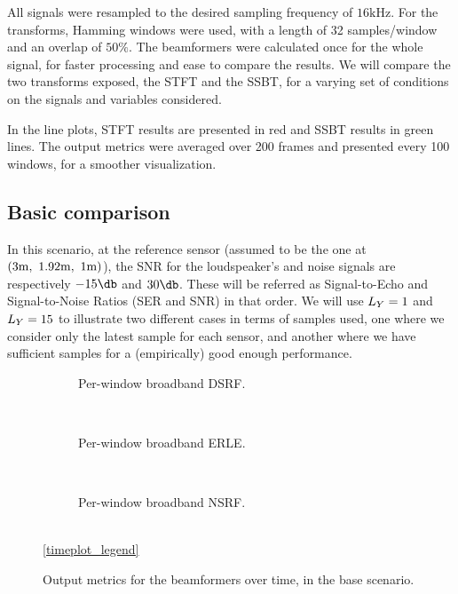 All signals were resampled to the desired sampling frequency of $16\si{\kilo\hertz}$. For the transforms, Hamming windows were used, with a length of 32 samples/window and an overlap of $50\%$. The beamformers were calculated once for the whole signal, for faster processing and ease to compare the results. We will compare the two transforms exposed, the STFT and the SSBT, for a varying set of conditions on the signals and variables considered.

In the line plots, STFT results are presented in red and SSBT results in green lines. The output metrics were averaged over 200 frames and presented every 100 windows, for a smoother visualization.
%

\subsection{Basic comparison}
In this scenario, at the reference sensor (assumed to be the one at $(3\si{\meter},~1.92\si{\meter},~1\si{\meter})$), the SNR for the loudspeaker's and noise signals are respectively $-15\dB$ and $30\dB$. These will be referred as Signal-to-Echo and Signal-to-Noise Ratios (SER and SNR) in that order. We will use $\Ly = 1$ and $\Ly = 15$ to illustrate two different cases in terms of samples used, one where we consider only the latest sample for each sensor, and another where we have sufficient samples for a (empirically) good enough performance.


\begin{figure}[!ht]
	\centering
	\begin{subfigure}{\textwidth}
		\centering
		
		\caption{Per-window broadband DSRF.}
		\label{subfig:lineplot__DSRF_l__iSER_n15__err_0}
	\end{subfigure}\\[1em]
	\begin{subfigure}{\textwidth}
		\centering
		
		\caption{Per-window broadband ERLE.}
		\label{subfig:lineplot__gSER_l__iSER_n15__err_0}
	\end{subfigure}\\[1em]
	\begin{subfigure}{\textwidth}
		\centering
		
		\caption{Per-window broadband NSRF.}
		\label{subfig:lineplot__gSNR_l__iSER_n15__err_0}
	\end{subfigure}\\[1em]
	\ref*{timeplot_legend}
	\caption{Output metrics for the beamformers over time, in the base scenario.}
	\label{fig:lineplot__iSER_n15__Ly_1__err_0}
\end{figure}

